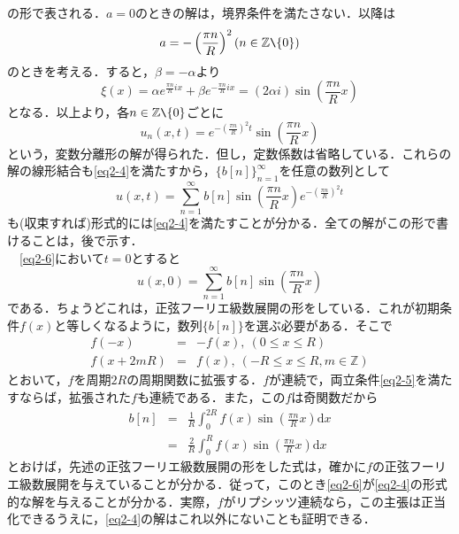 \documentclass[a4j]{jsbook}
\numberwithin{theorem}{chapter}  %
\begin{document}
の形で表される．\(a=0\)のときの解は，境界条件を満たさない．以降は
\begin{equation*}
    a=-\left(\frac{\pi n}{R}\right)^2 (n\in\mathbb{Z}\verb|\|\{0\})
\end{equation*}
のときを考える．すると，\(\beta=-\alpha\)より
\begin{equation*}
    \xi(x)=\alpha e^{\frac{\pi n}{R}ix}+\beta e^{-\frac{\pi n}{R}ix}=(2\alpha i)\sin\left(\frac{\pi n}{R}x\right)
\end{equation*}
となる．以上より，各\(n\in\mathbb{Z}\verb|\|\{0\}\)ごとに
\begin{equation*}
    u_n(x, t)=e^{-\left(\frac{\pi n}{R}\right)^2t}\sin\left(\frac{\pi n}{R}x\right)
\end{equation*}
という，変数分離形の解が得られた．但し，定数係数は省略している．これらの解の線形結合も\eqref{eq2-4}を満たすから，\(\{b[n]\}_{n=1}^\infty\)を任意の数列として
\begin{equation}
    u(x, t)=\sum_{n=1}^\infty b[n]\sin\left(\frac{\pi n}{R}x\right)e^{-\left(\frac{\pi n}{R}\right)^2t} \label{eq2-6}
\end{equation}
も(収束すれば)形式的には\eqref{eq2-4}を満たすことが分かる．全ての解がこの形で書けることは，後で示す． \\
　\eqref{eq2-6}において\(t=0\)とすると
\begin{equation*}
    u(x, 0)=\sum_{n=1}^\infty b[n]\sin\left(\frac{\pi n}{R}x\right)
\end{equation*}
である．ちょうどこれは，正弦フーリエ級数展開の形をしている．これが初期条件\(f(x)\)と等しくなるように，数列\(\{b[n]\}\)を選ぶ必要がある．そこで
\begin{eqnarray*}
f(-x)&=&-f(x),\ (0\leq x\leq R) \\
f(x+2mR)&=&f(x),\ (-R\leq x\leq R, m\in\mathbb{Z})
\end{eqnarray*}
とおいて，\(f\)を周期\(2R\)の周期関数に拡張する．\(f\)が連続で，両立条件\eqref{eq2-5}を満たすならば，拡張された\(f\)も連続である．また，この\(f\)は奇関数だから
\begin{eqnarray*}
b[n]&=&\frac{1}{R}\int_0^{2R}f(x)\sin\left(\frac{\pi n}{R}x\right)\mathrm{d}x \\
&=&\frac{2}{R}\int_0^R f(x)\sin\left(\frac{\pi n}{R}x\right)\mathrm{d}x
\end{eqnarray*}
とおけば，先述の正弦フーリエ級数展開の形をした式は，確かに\(f\)の正弦フーリエ級数展開を与えていることが分かる．従って，このとき\eqref{eq2-6}が\eqref{eq2-4}の形式的な解を与えることが分かる．実際，\(f\)がリプシッツ連続なら，この主張は正当化できるうえに，\eqref{eq2-4}の解はこれ以外にないことも証明できる．
\end{document}
